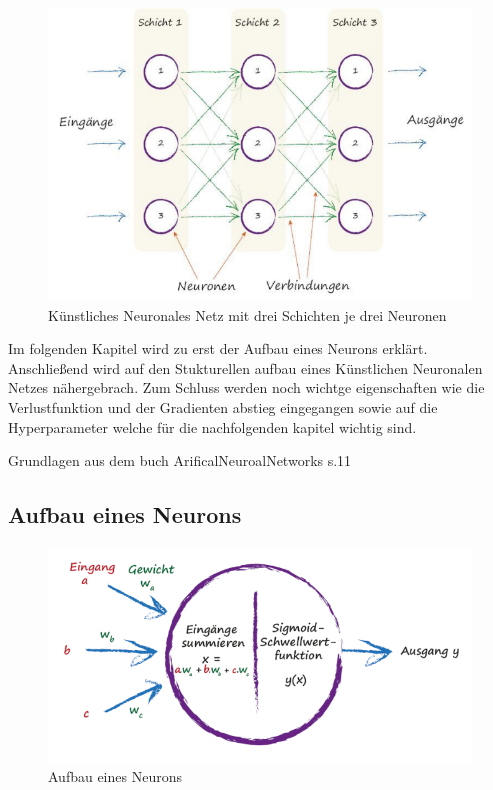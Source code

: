 \begin{figure}[htb]
  \centering  
  \includegraphics[scale=0.5]{img/S36_Buildyourown.png}
  \caption{Künstliches Neuronales Netz mit drei Schichten je drei Neuronen \cite{Rashid2017} }
  \label{fig:neural_network}
\end{figure}


Im folgenden Kapitel wird zu erst der Aufbau eines Neurons erklärt. Anschließend wird auf den Stukturellen aufbau eines  Künstlichen Neuronalen Netzes nähergebrach. Zum Schluss werden noch wichtge eigenschaften wie die Verlustfunktion und der Gradienten abstieg eingegangen sowie auf die Hyperparameter welche für die nachfolgenden kapitel wichtig sind.



Grundlagen aus dem buch ArificalNeuroalNetworks s.11 

\newpage



\subsection{Aufbau eines Neurons}



\begin{figure}[htb]
  \centering  
  \includegraphics[scale=0.5]{img/S41_Buildyourown.png}
  \caption{Aufbau eines Neurons \cite{Rashid2017}}
  \label{fig:neuron}
  

\end{figure}
